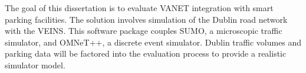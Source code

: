 
The goal of this dissertation is to evaluate VANET integration with smart parking facilities. The solution involves simulation of the Dublin road network with the \ac{VEINS}. This software package couples \ac{SUMO}, a microscopic traffic simulator, and \ac{OMNeT++}, a discrete event simulator. Dublin traffic volumes and parking data will be factored into the evaluation process to provide a realistic simulator model.\\